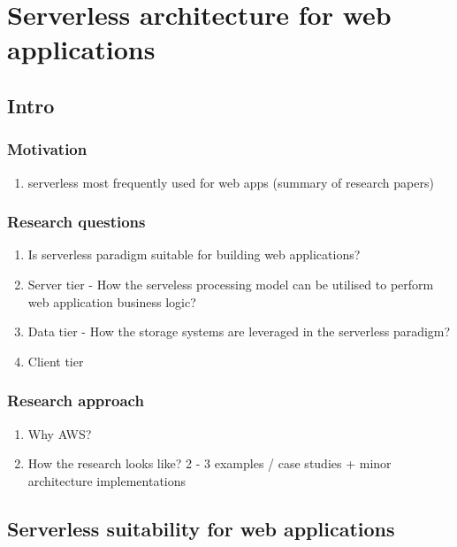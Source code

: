 \chapter{Serverless architecture for web applications}

\section{Intro}

\subsection{Motivation}

\begin{enumerate}
    \item serverless most frequently used for web apps (summary of research papers)
\end{enumerate}

\subsection{Research questions}

\begin{enumerate}
    \item Is serverless paradigm suitable for building web applications?
    \item Server tier - How the serveless processing model can be utilised to perform web application business logic?
    \item Data tier - How the storage systems are leveraged in the serverless paradigm?
    \item Client tier
\end{enumerate}

\subsection{Research approach}

\begin{enumerate}
    \item Why AWS?
    \item How the research looks like? 2 - 3 examples / case studies + minor architecture implementations
\end{enumerate}

\section{Serverless suitability for web applications}

